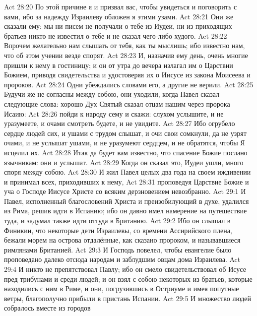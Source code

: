 \vs Act 28:20 По этой причине я и призвал вас, чтобы увидеться и поговорить с вами, ибо за надежду Израилеву обложен я этими узами.
\vs Act 28:21 Они же сказали ему: мы ни писем не получали о тебе из Иудеи, ни из приходящих братьев никто не известил о тебе и не сказал чего-либо худого.
\vs Act 28:22 Впрочем желательно нам слышать от тебя, как ты мыслишь; ибо известно нам, что об этом учении везде спорят.
\vs Act 28:23 И, назначив ему день, очень многие пришли к нему в гостиницу; и он от утра до вечера излагал им  о Царствии Божием, приводя свидетельства и удостоверяя их о Иисусе из закона Моисеева и пророков.
\vs Act 28:24 Одни убеждались словами его, а другие не верили.
\vs Act 28:25 Будучи же не согласны между собою, они уходили, когда Павел сказал следующие слова: хорошо Дух Святый сказал отцам нашим через пророка Исаию:
\vs Act 28:26 пойди к народу сему и скажи: слухом услышите, и не уразумеете, и очами смотреть будете, и не увидите.
\vs Act 28:27 Ибо огрубело сердце людей сих, и ушами с трудом слышат, и очи свои сомкнули, да не узрят очами, и не услышат ушами, и не уразумеют сердцем, и не обратятся, чтобы Я исцелил их.
\vs Act 28:28 Итак да будет вам известно, что спасение Божие послано язычникам: они и услышат.
\vs Act 28:29 Когда он сказал это, Иудеи ушли, много споря между собою.
\rsbpar\vs Act 28:30 И жил Павел целых два года на своем иждивении и принимал всех, приходивших к нему,
\vs Act 28:31 проповедуя Царствие Божие и уча о Господе Иисусе Христе со всяким дерзновением невозбранно.
\vs Act 29:1 И Павел, исполненный благословений Христа и преизобилующий в духе, удалился из Рима, решив идти в Испанию; ибо он давно имел намерение на путешествие туда, и задумал также идти оттуда в Британию.
\vs Act 29:2
Ибо он слышал в Финикии, что некоторые дети Израилевы,
со времени Ассирийского плена, бежали морем
на острова отдалённые, как сказано пророком,
и называвшиеся римлянами Британией.
\vs Act 29:3
И Господь повелел, чтобы евангелие было проповедано
далеко отсюда народам и заблудшим овцам дома Израилева.
\vs Act 29:4
И никто не препятствовал Павлу;
ибо он смело свидетельствовал об Исусе
пред трибунами и среди людей;
и он взял с собою некоторых из братьев,
которые находились с ним в Риме, и они,
погрузившись в Остриуме и имея попутные ветры,
благополучно прибыли в пристань Испании.
\vs Act 29:5
И множество людей собралось вместе из городов
